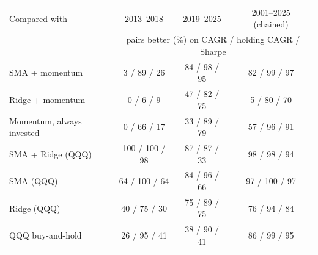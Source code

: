 \begin{tabular}{lccc}
\toprule
Compared with & 2013--2018 & 2019--2025 & 2001--2025 (chained) \\
 & \multicolumn{3}{c}{\footnotesize pairs better (\%) on CAGR / holding CAGR / Sharpe} \\
\midrule
SMA + momentum & 3 / 89 / 26 & 84 / 98 / 95 & 82 / 99 / 97 \\
Ridge + momentum & 0 / 6 / 9 & 47 / 82 / 75 & 5 / 80 / 70 \\
Momentum, always invested & 0 / 66 / 17 & 33 / 89 / 79 & 57 / 96 / 91 \\
\addlinespace
SMA + Ridge (QQQ) & 100 / 100 / 98 & 87 / 87 / 33 & 98 / 98 / 94 \\
SMA (QQQ) & 64 / 100 / 64 & 84 / 96 / 66 & 97 / 100 / 97 \\
Ridge (QQQ) & 40 / 75 / 30 & 75 / 89 / 75 & 76 / 94 / 84 \\
QQQ buy-and-hold & 26 / 95 / 41 & 38 / 90 / 41 & 86 / 99 / 95 \\
\bottomrule
\end{tabular}
